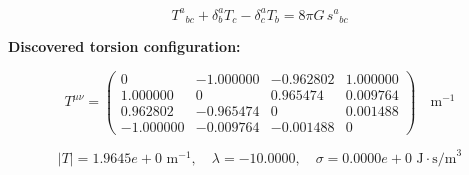 
\begin{equation}
  T^a{}_{bc} + \delta^a_b T_c - \delta^a_c T_b = 8\pi G \, s^a{}_{bc}
\end{equation}

\textbf{Discovered torsion configuration:}

\begin{equation}
  T^{\mu\nu} = \begin{pmatrix}
    0 & -1.000000 & -0.962802 & 1.000000 \\
    1.000000 & 0 & 0.965474 & 0.009764 \\
    0.962802 & -0.965474 & 0 & 0.001488 \\
    -1.000000 & -0.009764 & -0.001488 & 0
  \end{pmatrix} \quad \text{m}^{-1}
\end{equation}

\begin{equation}
  |T| = 1.9645e+0 \text{ m}^{-1}, \quad
  \lambda = -10.0000, \quad
  \sigma = 0.0000e+0 \text{ J}\cdot\text{s/m}^3
\end{equation}